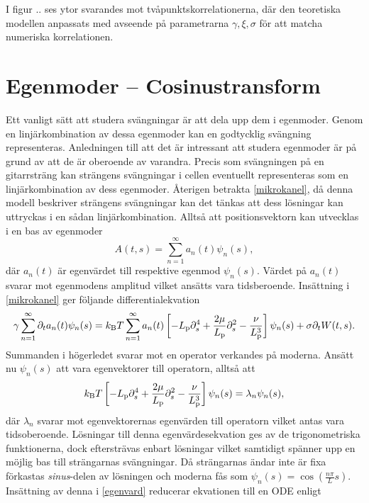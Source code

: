 I figur .. ses ytor svarandes mot tvåpunktskorrelationerna, där den teoretiska modellen anpassats med avseende på parametrarna $\gamma,\xi,\sigma$ för att matcha numeriska korrelationen. 



\section{Egenmoder -- Cosinustransform}
Ett vanligt sätt att studera svängningar är att dela upp dem i egenmoder. Genom en linjärkombination av dessa egenmoder kan en godtycklig svängning representeras. Anledningen till att det är intressant att studera egenmoder är på grund av att de är oberoende av varandra. Precis som svängningen på en gitarrsträng kan strängens svängningar i cellen eventuellt representeras som en linjärkombination av dess egenmoder. 
Återigen betrakta \eqref{mikrokanel}, då denna modell beskriver strängens svängningar kan det tänkas att dess lösningar kan uttryckas i en sådan linjärkombination. Alltså att positionsvektorn kan utvecklas i en bas av egenmoder
\begin{equation}
\label{basutv}
    A(t,s)=\sum_{n=1}^{\infty}a_{n}(t)\psi_{n}(s),
\end{equation}
där $a_{n}(t)$ är egenvärdet till respektive egenmod $\psi_{n}(s)$. Värdet på $a_{n}(t)$ svarar mot egenmodens amplitud vilket ansätts vara tidsberoende. Insättning i \eqref{mikrokanel} ger följande differentialekvation
\begin{equation}\label{egenvard}
    \gamma\sum_{n=1}^{\infty}\partial_{t}a_{n}(t)\psi_{n}(s)=k_{\text{B}}T\sum_{n=1}^{\infty}a_{n}(t)\left[-L_{\text{p}}\partial_{s}^{4}+\frac{2\mu}{L_{\text{p}}}\partial_{s}^{2}-\frac{\nu}{L_{\text{p}}^{3}}\right]\psi_{n}(s)+\sigma\partial_{t}W(t,s).
\end{equation}
Summanden i högerledet svarar mot en operator verkandes på moderna. Ansätt nu $\psi_{n}(s)$ att vara egenvektorer till operatorn, alltså att
\begin{equation}
    k_{\text{B}}T\left[-L_{\text{p}}\partial_{s}^{4}+\frac{2\mu}{L_{\text{p}}}\partial_{s}^{2}-\frac{\nu}{L_{\text{p}}^{3}}\right]\psi_{n}(s)=\lambda_{n}\psi_{n}(s),
\end{equation}
där $\lambda_{n}$ svarar mot egenvektorernas egenvärden till operatorn vilket antas vara tidsoberoende. Lösningar till denna egenvärdesekvation ges av de trigonometriska funktionerna, dock eftersträvas enbart lösningar vilket samtidigt spänner upp en möjlig bas till strängarnas svängningar. Då strängarnas ändar inte är fixa förkastas \emph{sinus}-delen av lösningen och moderna fås som \cite{PhysRevE.60.4671} $\psi_{n}(s)=\cos({\frac{n\pi}{L}s})$. Insättning av denna i \eqref{egenvard} reducerar ekvationen till en ODE enligt
